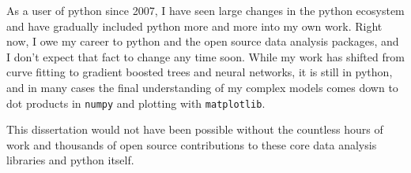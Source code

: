 As a user of python since 2007, I have seen large changes in the python
ecosystem and have gradually included python more and more into my own
work. Right now, I owe my career to python and the open source data
analysis packages, and I don't expect that fact to change any time soon.
While my work has shifted from curve fitting to gradient boosted trees
and neural networks, it is still in python, and in many cases the final
understanding of my complex models comes down to dot products in
\verb+numpy+ and plotting with \verb+matplotlib+.

This dissertation would not have been possible without the countless
hours of work and thousands of open source contributions to these core
data analysis libraries and python itself.

